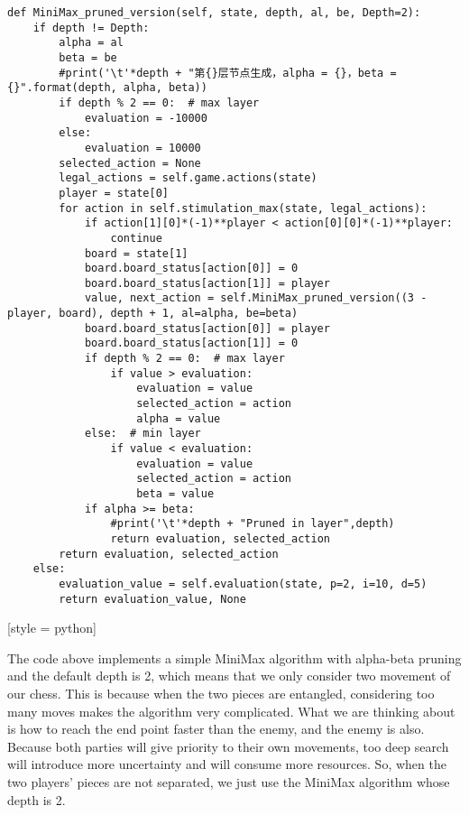 \documentclass[aps,letterpaper,10pt]{revtex4}
\begin{document}
\begin{lstlisting}[style = python]
def MiniMax_pruned_version(self, state, depth, al, be, Depth=2):
	if depth != Depth:
		alpha = al
		beta = be
		#print('\t'*depth + "第{}层节点生成，alpha = {}，beta = {}".format(depth, alpha, beta))
		if depth % 2 == 0:  # max layer
			evaluation = -10000
		else:
			evaluation = 10000
		selected_action = None
		legal_actions = self.game.actions(state)
		player = state[0]
		for action in self.stimulation_max(state, legal_actions):
			if action[1][0]*(-1)**player < action[0][0]*(-1)**player:
				continue
			board = state[1]
			board.board_status[action[0]] = 0
			board.board_status[action[1]] = player
			value, next_action = self.MiniMax_pruned_version((3 - player, board), depth + 1, al=alpha, be=beta)
			board.board_status[action[0]] = player
			board.board_status[action[1]] = 0
			if depth % 2 == 0:  # max layer
				if value > evaluation:
					evaluation = value
					selected_action = action
					alpha = value
			else:  # min layer
				if value < evaluation:
					evaluation = value
					selected_action = action
					beta = value
			if alpha >= beta:
				#print('\t'*depth + "Pruned in layer",depth)
				return evaluation, selected_action
		return evaluation, selected_action
	else:
		evaluation_value = self.evaluation(state, p=2, i=10, d=5)
		return evaluation_value, None
\end{lstlisting}[style = python]

The code above implements a simple MiniMax algorithm with alpha-beta pruning and the default depth is 2,
which means that we only consider two movement of our chess.
This is because when the two pieces are entangled, considering too many moves makes the algorithm very complicated. 
What we are thinking about is how to reach the end point faster than the enemy, and the enemy is also.
Because both parties will give priority to their own movements, too deep search will introduce more uncertainty and will consume more resources.
So, when the two players’ pieces are not separated, we just use the MiniMax algorithm whose depth is 2.
\end{document}
